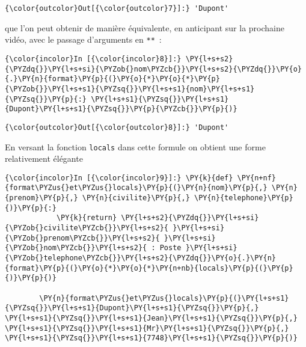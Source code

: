 \begin{Verbatim}[commandchars=\\\{\},frame=single,framerule=0.3mm,rulecolor=\color{cellframecolor}]
{\color{outcolor}Out[{\color{outcolor}7}]:} 'Dupont'
\end{Verbatim}
            
    que l'on peut obtenir de manière équivalente, en anticipant sur la
prochaine vidéo, avec le passage d'arguments en \texttt{**}~:

    \begin{Verbatim}[commandchars=\\\{\},frame=single,framerule=0.3mm,rulecolor=\color{cellframecolor}]
{\color{incolor}In [{\color{incolor}8}]:} \PY{l+s+s2}{\PYZdq{}}\PY{l+s+si}{\PYZob{}nom\PYZcb{}}\PY{l+s+s2}{\PYZdq{}}\PY{o}{.}\PY{n}{format}\PY{p}{(}\PY{o}{*}\PY{o}{*}\PY{p}{\PYZob{}}\PY{l+s+s1}{\PYZsq{}}\PY{l+s+s1}{nom}\PY{l+s+s1}{\PYZsq{}}\PY{p}{:} \PY{l+s+s1}{\PYZsq{}}\PY{l+s+s1}{Dupont}\PY{l+s+s1}{\PYZsq{}}\PY{p}{\PYZcb{}}\PY{p}{)}
\end{Verbatim}


\begin{Verbatim}[commandchars=\\\{\},frame=single,framerule=0.3mm,rulecolor=\color{cellframecolor}]
{\color{outcolor}Out[{\color{outcolor}8}]:} 'Dupont'
\end{Verbatim}
            
    En versant la fonction \texttt{locals} dans cette formule on obtient une
forme relativement élégante

    \begin{Verbatim}[commandchars=\\\{\},frame=single,framerule=0.3mm,rulecolor=\color{cellframecolor}]
{\color{incolor}In [{\color{incolor}9}]:} \PY{k}{def} \PY{n+nf}{format\PYZus{}et\PYZus{}locals}\PY{p}{(}\PY{n}{nom}\PY{p}{,} \PY{n}{prenom}\PY{p}{,} \PY{n}{civilite}\PY{p}{,} \PY{n}{telephone}\PY{p}{)}\PY{p}{:}
            \PY{k}{return} \PY{l+s+s2}{\PYZdq{}}\PY{l+s+si}{\PYZob{}civilite\PYZcb{}}\PY{l+s+s2}{ }\PY{l+s+si}{\PYZob{}prenom\PYZcb{}}\PY{l+s+s2}{ }\PY{l+s+si}{\PYZob{}nom\PYZcb{}}\PY{l+s+s2}{ : Poste }\PY{l+s+si}{\PYZob{}telephone\PYZcb{}}\PY{l+s+s2}{\PYZdq{}}\PY{o}{.}\PY{n}{format}\PY{p}{(}\PY{o}{*}\PY{o}{*}\PY{n+nb}{locals}\PY{p}{(}\PY{p}{)}\PY{p}{)}
        
        \PY{n}{format\PYZus{}et\PYZus{}locals}\PY{p}{(}\PY{l+s+s1}{\PYZsq{}}\PY{l+s+s1}{Dupont}\PY{l+s+s1}{\PYZsq{}}\PY{p}{,} \PY{l+s+s1}{\PYZsq{}}\PY{l+s+s1}{Jean}\PY{l+s+s1}{\PYZsq{}}\PY{p}{,} \PY{l+s+s1}{\PYZsq{}}\PY{l+s+s1}{Mr}\PY{l+s+s1}{\PYZsq{}}\PY{p}{,} \PY{l+s+s1}{\PYZsq{}}\PY{l+s+s1}{7748}\PY{l+s+s1}{\PYZsq{}}\PY{p}{)}
\end{Verbatim}


